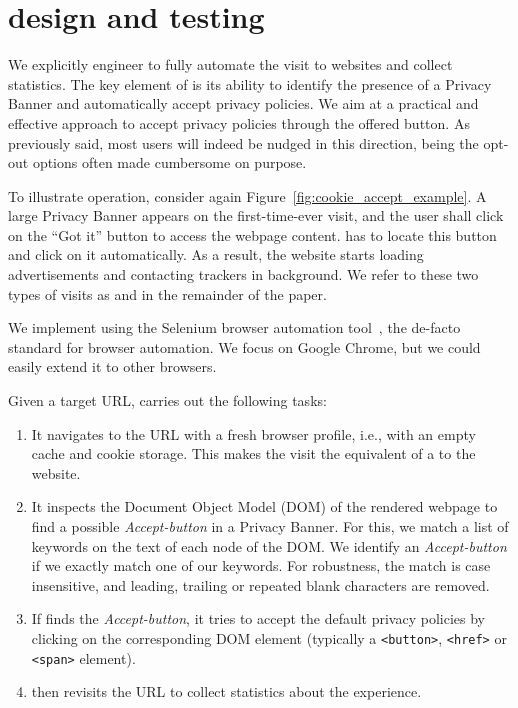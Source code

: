 \section{\TOOL design and testing}
\label{sec:metho}

We explicitly engineer \TOOL to fully automate the visit to websites and collect statistics. The key element of \TOOL is its ability to identify the presence of a Privacy Banner and automatically accept privacy policies. We aim at a practical and effective approach to accept privacy policies through the offered button. As previously said, most users will indeed be nudged in this direction, being the opt-out options often made cumbersome on purpose\cite{bauer2021you, hausner2021dark, CookieBenchmarkStudy}.

To illustrate \TOOL operation, consider again Figure~\ref{fig:cookie_accept_example}. A large Privacy Banner appears on the first-time-ever visit, and the user shall click on the ``Got it'' button to access the webpage content. \TOOL has to locate this button and click on it automatically. As a result, the website starts loading advertisements and contacting trackers in background. We refer to these two types of visits as \BEFORE and \AFTER in the remainder of the paper.

We implement \TOOL using the Selenium browser automation tool~\cite{avasarala2014selenium}, the de-facto standard for browser automation. We focus on Google Chrome, but we could easily extend it to other browsers.

Given a target URL, \TOOL carries out the following tasks:
\begin{enumerate}
    \item It navigates to the URL with a fresh browser profile, i.e., with an empty cache and cookie storage. This makes the visit the equivalent of a \BEFORE to the website.
    \item It inspects the Document Object Model (DOM) of the rendered webpage to find a possible \emph{Accept-button} in a Privacy Banner. For this, we match a list of keywords on the text of each node of the DOM. We identify an \emph{Accept-button} if we exactly match one of our keywords. For robustness, the match is case insensitive, and leading, trailing or repeated blank characters are removed.
    \item If \TOOL finds the \emph{Accept-button}, it tries to accept the default privacy policies by clicking on the corresponding DOM element (typically a \texttt{<button>}, \texttt{<href>} or \texttt{<span>} element).
    \item \TOOL then revisits the URL to collect statistics about the \AFTER experience.
\end{enumerate}

